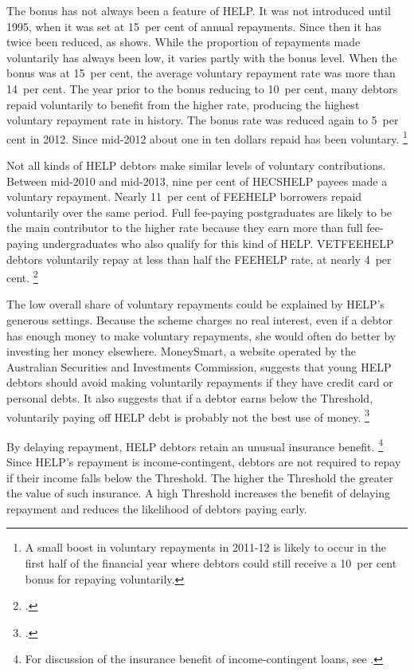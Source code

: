 \documentclass[embargoed]{grattan}
\begin{document}
The bonus has not always been a feature of \gls{HELP}\@.
It was not introduced until 1995, when it was set at 15~per cent of annual repayments.
Since then it has twice been reduced, as  shows.
While the proportion of repayments made voluntarily has always been low, it varies partly with the bonus level.
When the bonus was at 15~per cent, the average voluntary repayment rate was more than 14~per cent.
The year prior to the bonus reducing to 10~per cent, many debtors repaid voluntarily to benefit from the higher rate, producing the highest voluntary repayment rate in history.
The bonus rate was reduced again to 5~per cent in 2012.
Since mid-2012 about one in ten dollars repaid has been voluntary.%
\footnote{A small boost in voluntary repayments in 2011-12 is likely to occur in the first half of the financial year where debtors could still receive a 10~per cent bonus for repaying voluntarily.}

Not all kinds of \gls{HELP} debtors make similar levels of voluntary contributions.
Between mid-2010 and mid-2013, nine per cent of \gls{HECSHELP} payees made a voluntary repayment.
Nearly 11~per cent of \gls{FEEHELP} borrowers repaid voluntarily over the same period.
Full fee-paying postgraduates are likely to be the main contributor to the higher rate because they earn more than full fee-paying undergraduates who also qualify for this kind of \gls{HELP}\@.
\gls{VETFEEHELP} debtors voluntarily repay at less than half the \gls{FEEHELP} rate, at nearly 4~per cent.%
\footcite[][33]{ANAO2016AdministrationHigherEducation}

The low overall share of voluntary repayments could be explained by \gls{HELP}'s generous settings.
Because the scheme charges no real interest, even if a debtor has enough money to make voluntary repayments, she would often do better by investing her money elsewhere.
MoneySmart, a website operated by the Australian Securities and Investments Commission, suggests that young \gls{HELP} debtors should avoid making voluntarily repayments if they have credit card or personal debts.
It also suggests that if a debtor earns below the \gls{Threshold}, voluntarily paying off \gls{HELP} debt is probably not the best use of money.%
\footcite{MoneySmart2016Payingyouruni}

By delaying repayment, \gls{HELP} debtors retain an unusual insurance benefit.%
\footnote{For discussion of the insurance benefit of income-contingent loans, see \textcite[][36]{Chapman2014Incomecontingentloans}.} 
Since \gls{HELP}'s repayment is income-contingent, debtors are not required to repay if their income falls below the \gls{Threshold}.
The higher the \gls{Threshold} the greater the value of such insurance. A high \gls{Threshold} increases the benefit of delaying repayment and reduces the likelihood of debtors paying early.
\end{document}

